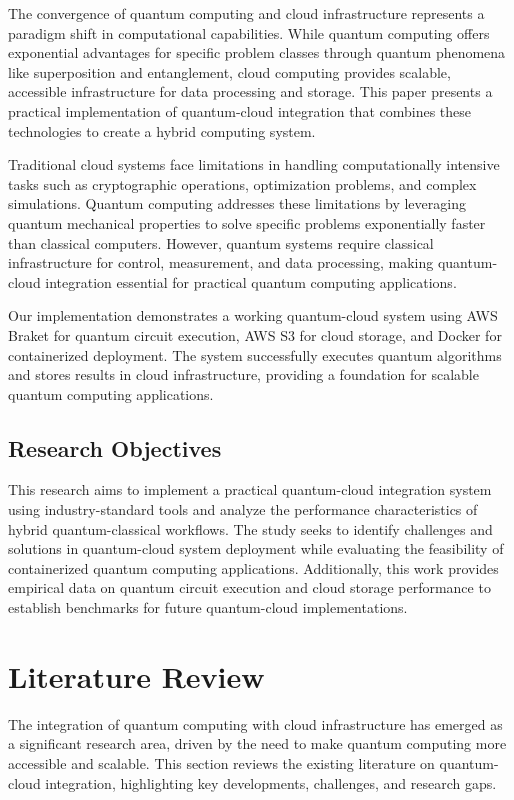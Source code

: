 \documentclass[onecolumn]{IEEEtran}
\begin{document}
The convergence of quantum computing and cloud infrastructure represents a paradigm shift in computational capabilities. While quantum computing offers exponential advantages for specific problem classes through quantum phenomena like superposition and entanglement, cloud computing provides scalable, accessible infrastructure for data processing and storage. This paper presents a practical implementation of quantum-cloud integration that combines these technologies to create a hybrid computing system.

Traditional cloud systems face limitations in handling computationally intensive tasks such as cryptographic operations, optimization problems, and complex simulations. Quantum computing addresses these limitations by leveraging quantum mechanical properties to solve specific problems exponentially faster than classical computers. However, quantum systems require classical infrastructure for control, measurement, and data processing, making quantum-cloud integration essential for practical quantum computing applications.

Our implementation demonstrates a working quantum-cloud system using AWS Braket for quantum circuit execution, AWS S3 for cloud storage, and Docker for containerized deployment. The system successfully executes quantum algorithms and stores results in cloud infrastructure, providing a foundation for scalable quantum computing applications.

\subsection{Research Objectives}
This research aims to implement a practical quantum-cloud integration system using industry-standard tools and analyze the performance characteristics of hybrid quantum-classical workflows. The study seeks to identify challenges and solutions in quantum-cloud system deployment while evaluating the feasibility of containerized quantum computing applications. Additionally, this work provides empirical data on quantum circuit execution and cloud storage performance to establish benchmarks for future quantum-cloud implementations.

\section{Literature Review}

The integration of quantum computing with cloud infrastructure has emerged as a significant research area, driven by the need to make quantum computing more accessible and scalable. This section reviews the existing literature on quantum-cloud integration, highlighting key developments, challenges, and research gaps.
\end{document}
